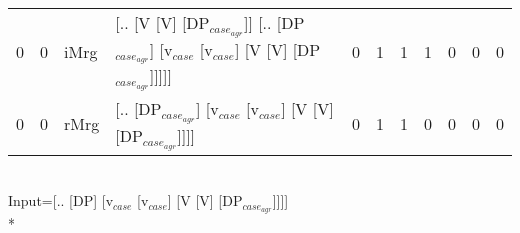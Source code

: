 \begin{tabularx}{\linewidth}{rrlXrrrrrrr}
   0 &   0 & iMrg & [.. [V [V] [DP$_{case_{agr}}$]] [.. [DP$_{case_{agr}}$] [v$_{case}$ [v$_{case}$] [V [V] [DP$_{case_{agr}}$]]]]]                   &            0 &             1 &             1 &                  1 &              0 &                0 &              0 \\
   0 &   0 & rMrg & [.. [DP$_{case_{agr}}$] [v$_{case}$ [v$_{case}$] [V [V] [DP$_{case_{agr}}$]]]]                                              &            0 &             1 &             1 &                  0 &              0 &                0 &              0 \\
\hline
\end{tabularx}\endgroup\\
\begingroup\scriptsize Input=[.. [DP] [v$_{case}$ [v$_{case}$] [V [V] [DP$_{case_{agr}}$]]]]\\*
